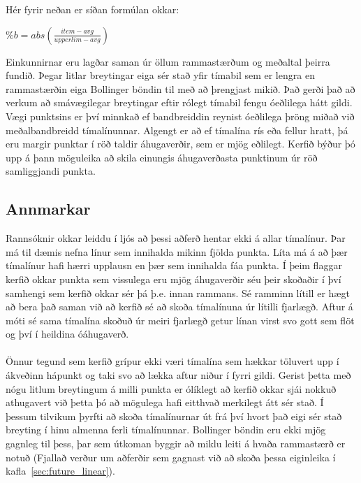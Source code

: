 \documentclass{article}
\begin{document}
Hér fyrir neðan er síðan formúlan okkar:


\begin{center}
  $\%b=abs(\frac{item - avg}{upperlim - avg})$
\end{center}

Einkunnirnar eru lagðar saman úr öllum rammastærðum og meðaltal þeirra fundið.
Þegar litlar breytingar eiga sér stað yfir tímabil sem er lengra en rammastærðin eiga
Bollinger böndin til með að þrengjast mikið. Það gerði það að verkum að smávægilegar breytingar eftir
rólegt tímabil fengu óeðlilega hátt gildi. 
Vægi punktsins er því minnkað ef bandbreiddin reynist óeðlilega þröng miðað við meðalbandbreidd
tímalínunnar.
Algengt er að ef tímalína rís eða fellur hratt, þá eru margir punktar í röð
taldir áhugaverðir, sem er mjög eðlilegt.
Kerfið býður þó upp á þann möguleika að skila einungis áhugaverðasta punktinum
úr röð samliggjandi punkta.

\subsection{Annmarkar}

Rannsóknir okkar leiddu í ljós að þessi aðferð hentar ekki á allar tímalínur.
Þar má til dæmis nefna línur sem innihalda mikinn fjölda punkta.
Líta má á að þær tímalínur hafi \ilqq hærri\irqq \hspace{1pt} upplausn en þær sem innihalda fáa punkta. 
Í þeim flaggar kerfið okkar punkta sem vissulega eru mjög
áhugaverðir séu þeir skoðaðir í því samhengi sem kerfið okkar sér þá þ.e. innan
rammans. Sé ramminn lítill er hægt að bera það saman við að kerfið sé að skoða
tímalínuna úr lítilli fjarlægð. Aftur á móti sé sama tímalína skoðuð úr meiri
fjarlægð getur línan virst svo gott sem flöt og því í heildina óáhugaverð.
\\ \hfill
\\
Önnur tegund sem kerfið grípur ekki væri tímalína sem hækkar töluvert upp í ákveðinn
hápunkt og taki svo að lækka aftur niður í fyrri gildi. Gerist þetta með nógu
litlum breytingum á milli punkta er ólíklegt að kerfið okkar sjái nokkuð
athugavert við þetta þó að mögulega hafi eitthvað merkilegt átt sér stað. 
Í þessum tilvikum þyrfti að skoða tímalínurnar út frá því hvort
það eigi sér stað breyting í hinu almenna ferli tímalínunnar. Bollinger böndin
eru ekki mjög gagnleg til þess, þar sem útkoman byggir að miklu leiti á hvaða
rammastærð er notuð (Fjallað verður um aðferðir sem gagnast við að skoða þessa eiginleika í kafla~\ref{sec:future_linear}). 
\end{document}
